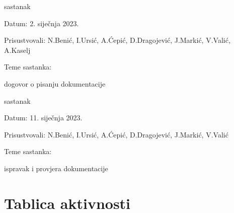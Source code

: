 \begin{packed_enum}
   \eject

   \item  sastanak
			\item[] \begin{packed_item}
				\item Datum: 2. siječnja 2023.
				\item Prisustvovali: N.Benić, I.Ursić, A.Ćepić, D.Dragojević, J.Markić, V.Valić, A.Kaselj 
				\item Teme sastanka:
				\begin{packed_item}
					\item  dogovor o pisanju dokumentacije
				\end{packed_item}
			\end{packed_item}

    \item  sastanak
			\item[] \begin{packed_item}
				\item Datum: 11. siječnja 2023.
				\item Prisustvovali: N.Benić, I.Ursić, A.Ćepić, D.Dragojević, J.Markić, V.Valić 
				\item Teme sastanka:
				\begin{packed_item}
					\item  ispravak i provjera dokumentacije
				\end{packed_item}
			\end{packed_item}
			
			
		\end{packed_enum}
		
		\eject
		\section*{Tablica aktivnosti}

